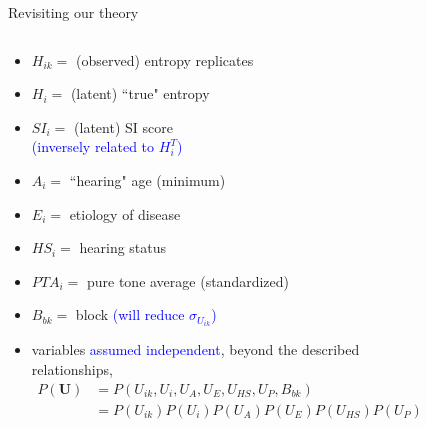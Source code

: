 %
%
\begin{frame}
	{Revisiting our theory}
	\begin{columns}
		\begin{column}{0.5\textwidth}
			\begin{itemize}
				\item $H_{ik}=$ (observed) entropy replicates
				\item $H_{i}=$ (latent) ``true" entropy
				\item $SI_{i}=$ (latent) SI score \\
				{\small \textcolor{blue}{(inversely related to $H^{T}_{i}$)} }
				\item $A_{i}=$ ``hearing" age (minimum)
				\item $E_{i}=$ etiology of disease
				\item $HS_{i}=$ hearing status
				\item $PTA_{i}=$ pure tone average (standardized)
				\item $B_{bk}=$ block {\small \textcolor{blue}{(will reduce $\sigma_{U_{ik}}$) } }
				\item variables \textcolor{blue}{assumed independent}, beyond the described relationships,
				\begin{equation*}
					\begin{aligned} 
						P(\pmb{U}) & = P(U_{ik}, U_{i}, U_{A}, U_{E}, U_{HS}, U_{P}, B_{bk}) \\ 
						& = P(U_{ik}) P(U_{i}) P(U_{A}) P(U_{E}) P(U_{HS}) P(U_{P}) P(B_{bk})
					\end{aligned}
				\end{equation*}
			\end{itemize}
		\end{column}
		\begin{column}{0.5\textwidth}  
			\begin{figure}
\end{figure}
\end{column}
\end{columns}
\end{frame}
